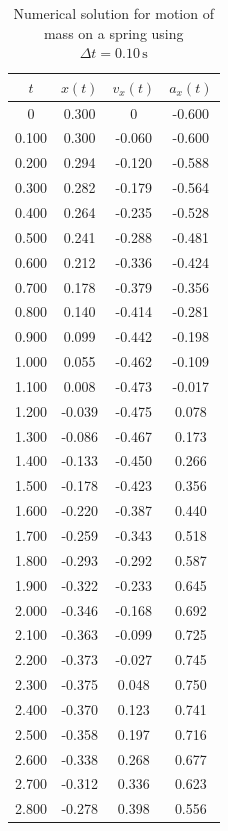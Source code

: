 \begin{table}[!t]
\caption{Numerical solution for motion of 
mass on a spring using $\Delta t=0.10\, \mbox{s}$}
\begin{center}
\begin{tabular}{cccc}
$t$ & $x(t)$ & $v_x(t)$ & $a_x(t)$ \\
\hline
0  &  0.300  &  0  &  -0.600\\
0.100  &  0.300  &  -0.060  &  -0.600\\
0.200  &  0.294  &  -0.120  &  -0.588\\
0.300  &  0.282  &  -0.179  &  -0.564\\
0.400  &  0.264  &  -0.235  &  -0.528\\
0.500  &  0.241  &  -0.288  &  -0.481\\
0.600  &  0.212  &  -0.336  &  -0.424\\
0.700  &  0.178  &  -0.379  &  -0.356\\
0.800  &  0.140  &  -0.414  &  -0.281\\
0.900  &  0.099  &  -0.442  &  -0.198\\
1.000  &  0.055  &  -0.462  &  -0.109\\
1.100  &  0.008  &  -0.473  &  -0.017\\
1.200  &  -0.039  &  -0.475  &  0.078\\
1.300  &  -0.086  &  -0.467  &  0.173\\
1.400  &  -0.133  &  -0.450  &  0.266\\
1.500  &  -0.178  &  -0.423  &  0.356\\
1.600  &  -0.220  &  -0.387  &  0.440\\
1.700  &  -0.259  &  -0.343  &  0.518\\
1.800  &  -0.293  &  -0.292  &  0.587\\
1.900  &  -0.322  &  -0.233  &  0.645\\
2.000  &  -0.346  &  -0.168  &  0.692\\
2.100  &  -0.363  &  -0.099  &  0.725\\
2.200  &  -0.373  &  -0.027  &  0.745\\
2.300  &  -0.375  &  0.048  &  0.750\\
2.400  &  -0.370  &  0.123  &  0.741\\
2.500  &  -0.358  &  0.197  &  0.716\\
2.600  &  -0.338  &  0.268  &  0.677\\
2.700  &  -0.312  &  0.336  &  0.623\\
2.800  &  -0.278  &  0.398  &  0.556\\

\end{tabular}
\end{center}
\end{table}
